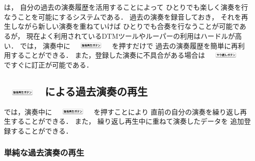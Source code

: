 %
%
\section{\system}
\label{repiano}

{\system}は，
自分の過去の演奏履歴を活用することによって
ひとりでも楽しく演奏を行なうことを可能にするシステムである．
%
過去の演奏を録音しておき，
それを再生しながら新しい演奏を重ねていけば
ひとりでも合奏を行なうことが可能であるが，
現在よく利用されているDTMツールやルーパーの利用はハードルが高い．
{\system}では，
演奏中に
\includegraphics[height=3mm,width=20mm,bb=3 23 360 80]{images/recbutton.png}
を押すだけで
過去の演奏履歴を簡単に再利用することができる．
また，登録した演奏に不具合がある場合は
\includegraphics[height=3mm,width=20mm,bb=3 23 360 80]{images/undobutton.png}
ですぐに訂正が可能である．

\subsection{\protect\includegraphics[height=3mm,width=20mm,bb=3 23 360 80]{images/recbutton.png} による過去演奏の再生}
\label{recplaybutton}

{\system}では，演奏中に
\includegraphics[height=3mm,width=20mm,bb=3 23 360 80]{images/recbutton.png}
を押すことにより
直前の自分の演奏を繰り返し再生することができる．
また，
繰り返し再生中に重ねて演奏したデータを
追加登録することができる．

\subsubsection{単純な過去演奏の再生}

